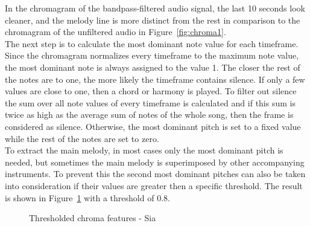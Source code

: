 \noindent In the chromagram of the bandpass-filtered audio signal, the last 10 seconds look cleaner, and the melody line is more distinct from the rest in comparison to the chromagram of the unfiltered audio in Figure~\ref{fig:chroma1}.\\
The next step is to calculate the most dominant note value for each timeframe. Since the chromagram normalizes every timeframe to the maximum note value, the most dominant note is always assigned to the value 1. The closer the rest of the notes are to one, the more likely the timeframe contains silence. If only a few values are close to one, then a chord or harmony is played. To filter out silence the sum over all note values of every timeframe is calculated and if this sum is twice as high as the average sum of notes of the whole song, then the frame is considered as silence. Otherwise, the most dominant pitch is set to a fixed value while the rest of the notes are set to zero.\\
\noindent To extract the main melody, in most cases only the most dominant pitch is needed, but sometimes the main melody is superimposed by other accompanying instruments. To prevent this the second most dominant pitches can also be taken into consideration if their values are greater then a specific threshold. The result is shown in Figure~\ref{fig:chromavg} with a threshold of 0.8.
\begin{figure}[htbp]
	\centering
	\caption{Thresholded chroma features - Sia}
	\label{fig:chromavg}
\end{figure}
\FloatBarrier

